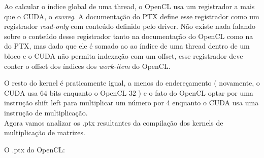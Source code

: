 Ao calcular o índice global de uma thread, o OpenCL usa um registrador a mais que o CUDA, o \textit{envreg}. A documentação do
PTX define esse registrador como um registrador \textit{read-only} com conteúdo definido pelo driver. Não existe nada falando sobre
o conteúdo desse registrador tanto na documentação do OpenCL como na do PTX, mas dado que ele é somado ao ao índice de uma thread
dentro de um bloco e o CUDA não permita indexação com um offset, esse registrador deve conter o offset dos índices dos
\textit{work-item} do OpenCL.

O resto do kernel é praticamente igual, a menos do endereçamento ( novamente, o CUDA usa 64 bits enquanto o OpenCL 32 ) e o fato
do OpenCL optar por uma instrução shift left para multiplicar um número por 4 enquanto o CUDA usa uma instrução de multiplicação. \\

Agora vamos analizar os .ptx resultantes da compilação dos kernels de multiplicação de matrizes.

O .ptx do OpenCL:

